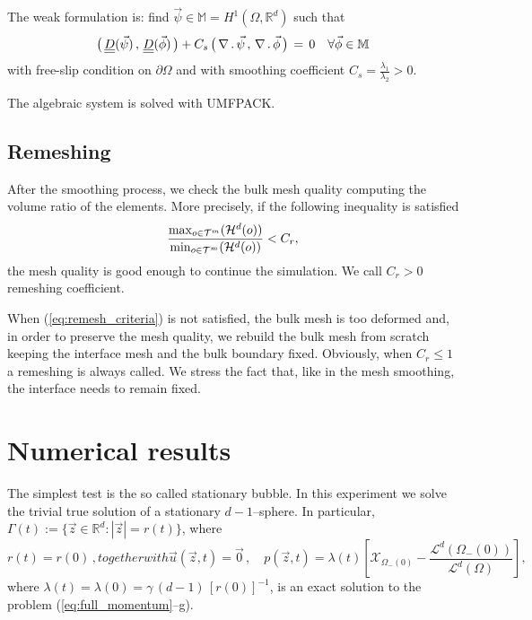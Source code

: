 \documentclass[a4paper,12pt,onecolumn]{article}
\newcommand{\R}{{\mathbb R}}
\newcommand{\bigchi}{\ensuremath{\mathrm{\mathcal{X}}}}
\newcommand{\charfcn}[1]{\bigchi_{#1}} %
\newcommand{\sigmaO}{o}
\newcommand{\mat}[1]{\underline{\underline{#1}}\rule{0pt}{0pt}}
\begin{document}
The weak formulation is: find $\vec\psi\in \mathbb{M}= H^1(\Omega, \R^d)$ such that
\begin{equation}
\big(\,\mat D(\vec\psi)\,,\,\mat D (\vec \phi)\,\big)+ C_s\,\big(\,
\nabla\,.\,\vec \psi\,,\,\nabla\,.\,\vec\phi\,\big)\, =\, 0\quad \forall \vec
\phi \in\mathbb{M}
\end{equation}
with free-slip condition on $\partial\Omega$ and with smoothing coefficient
$C_s=\frac{\lambda_1}{\lambda_2}>0$.

The algebraic system is solved with UMFPACK.

\subsection{Remeshing} \label{subsec:remeshing}

After the smoothing process, we check the bulk mesh quality computing the
volume ratio of the elements. More precisely, if the following inequality is
satisfied
\begin{equation}\label{eq:remesh_criteria}
\frac{\max_{\sigmaO\in {\cal
T}^m}(\mathcal{H}^{d}(\sigmaO))}{\min_{\sigmaO\in\mathcal
{T}^m}(\mathcal{H}^{d}(\sigmaO))}<C_r,
\end{equation}
the mesh quality is good enough to continue the simulation. We call $C_r>0$
remeshing coefficient.

When (\ref{eq:remesh_criteria}) is not satisfied, the bulk mesh is too deformed
and, in order to preserve the mesh quality, we rebuild the bulk mesh from
scratch keeping the interface mesh and the bulk boundary fixed. Obviously, when
$C_r\leq 1$ a remeshing is always called. We stress the fact that, like in the
mesh smoothing, the interface needs to remain fixed.

\section{Numerical results} \label{sec:numerical_results}

The simplest test is the so called stationary bubble. In this experiment we
solve the trivial true solution of a stationary $d-1$--sphere. In particular,
$\Gamma(t) := \{ \vec z \in \R^d : |\vec z| = r(t)\}$, where
\begin{subequations}
\begin{equation} \label{eq:radialr}
r(t) = r(0)\,,
\end{equation}
together with
\begin{equation} \label{eq:radialup}
\vec u(\vec z, t) = \vec 0 \,,\quad p(\vec z, t) =
\lambda(t)\left[\charfcn{\Omega_-(0)}
-\frac{\mathcal{L}^d(\Omega_-(0))}{\mathcal{L}^d(\Omega)} \right] ,
\end{equation}
\end{subequations}
where $\lambda(t) = \lambda(0) = \gamma\,(d-1)\,[r(0)]^{-1}$, is an exact
solution to the problem (\ref{eq:full_momentum}--g).
\end{document}

